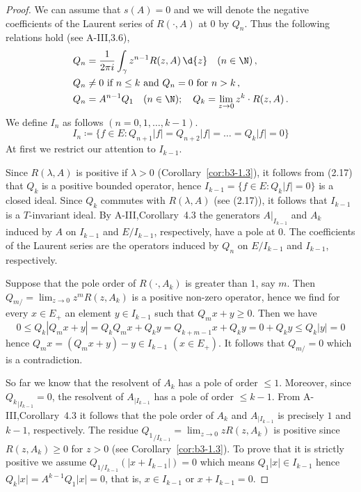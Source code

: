 \begin{proof}
	We can assume that $s(A) = 0$ and we will denote the negative coefficients of the Laurent series of $R(\cdot,A)$ at $0$ by $Q_{n}$.
	Thus the following relations hold (see A-III,3.6),
	\begin{equation}\label{eq:b3-2.17}
	\begin{split}
		Q_{n} &= \frac{1}{2\pi i}\int_{\gamma} z^{n-1}R(z,A) \, \d{z} \quad (n \in \N)\,, \\
		Q_{n} &\neq 0 \text{ if } n \leq k \text{ and } Q_{n} = 0 \text{ for } n > k\,, \\
		Q_{n} &= A^{n-1}Q_{1} \quad (n \in \N); \quad Q_{k} = \lim_{z \to 0}z^{k}\cdot R(z,A)\,.
	\end{split}
	\end{equation}
	We define $I_{n}$ as follows $(n = 0,1,\ldots,k-1)$.
	\[
	I_{n} \coloneqq \{f \in E \colon Q_{n+1}|f| = Q_{n+2}|f| = \ldots = Q_{k}|f| = 0\}
	\]
	At first we restrict our attention to $I_{k-1}$.
	
	Since $R(\lambda,A)$ is positive if $\lambda > 0$ (Corollary~\ref{cor:b3-1.3}), it follows from (2.17) that $Q_{k}$ is a positive bounded operator, hence $I_{k-1} = \{f \in E \colon Q_{k}|f| = 0\}$ is a closed ideal.
	Since $Q_{k}$ commutes with $R(\lambda,A)$ (see (2.17)), it follows that $I_{k-1}$ is a $T$-invariant ideal.
	By A-III,Corollary~4.3 the generators $A|_{I_{k-1}}$ and $A_{k}$ induced by $A$ on $I_{k-1}$ and $E/I_{k-1}$, respectively, have a pole at $0$.
	The coefficients of the Laurent series are the operators induced by $Q_{n}$ on $E/I_{k-1}$ and $I_{k-1}$, respectively.
	
	Suppose that the pole order of $R(\cdot,A_{k})$ is greater than $1$, say $m$.
	Then $Q_{m/} = \lim_{z \to 0}z^{m}R(z,A_{k})$ is a positive non-zero operator, hence we find for every $x \in E_{+}$ an element $y \in I_{k-1}$ such that $Q_{m}x + y \geq 0$.
	Then we have
	\[
	0 \leq Q_{k}|Q_{m}x + y| = Q_{k}Q_{m}x + Q_{k}y = Q_{k+m-1}x + Q_{k}y = 0 + Q_{k}y \leq Q_{k}|y| = 0
	\]
	hence $Q_{m}x = (Q_{m}x + y) - y \in I_{k-1}$ $(x \in E_{+})$.
	It follows that $Q_{m/} = 0$ which is a contradiction.
	
	So far we know that the resolvent of $A_{k}$ has a pole of order $\leq 1$.
	Moreover, since ${Q_{k}}_{|I_{k-1}} = 0$, 
	the resolvent of $A_{|I_{k-1}}$ has a pole of order $\leq k-1$.
	From A-III,Corollary~4.3 it follows that the pole order of $A_{k}$ and $A_{|I_{k-1}}$ is precisely $1$ and $k-1$, respectively.
	The residue ${Q_{1}}_{/I_{k-1}} = \lim_{z \to 0}zR(z,A_{k})$ is positive since $R(z,A_{k}) \geq 0$ for $z > 0$ (see Corollary~\ref{cor:b3-1.3}).
	To prove that it is strictly positive we assume $Q_{1/I_{k-1}}(|x + I_{k-1}|) = 0$ which means $Q_{1}|x| \in I_{k-1}$ hence $Q_{k}|x| = A^{k-1}Q_{1}|x| = 0$, that is, $x \in I_{k-1}$ or $x + I_{k-1} = 0$.
	

\end{proof}
